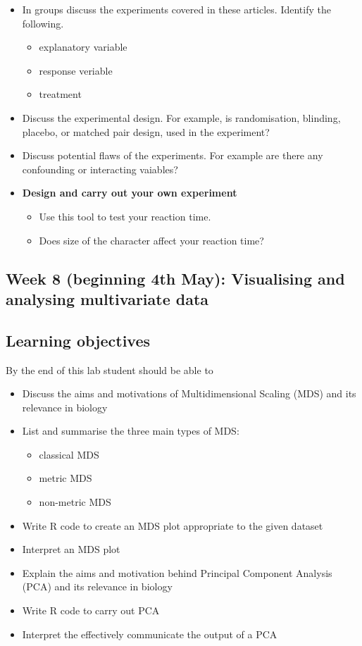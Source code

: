 \documentclass{article}
\begin{document}
\begin{itemize}
\item In groups discuss the experiments covered in these articles. Identify the following.
  \begin{itemize}
  \item explanatory variable
  \item response veriable
  \item treatment 
  \end{itemize}
\item Discuss the experimental design. For example, is randomisation, blinding, placebo, or matched pair design, used in the experiment?
\item Discuss potential flaws of the experiments. For example are there any confounding or interacting vaiables?
\item \textbf{Design and carry out your own experiment}
  \begin{itemize}
  \item Use this tool to test your reaction time.
  \item Does size of the character affect your reaction time?
  \end{itemize}
\end{itemize}

\subsection*{Week 8 (beginning 4th May): Visualising and analysing multivariate data}
\subsection*{Learning objectives}
By the end of this lab student should be able to
\begin{itemize}
\item Discuss the aims and motivations of Multidimensional Scaling (MDS) and its relevance in biology
\item List and summarise the three main types of MDS:
  \begin{itemize}
  \item classical MDS
  \item metric MDS
  \item non-metric MDS
  \end{itemize}
\item Write R code to create an MDS plot appropriate to the given dataset
\item Interpret an MDS plot
\item Explain the aims and motivation behind Principal Component Analysis (PCA) and its relevance in biology 
\item Write R code to carry out PCA
  \item Interpret the effectively communicate the output of a PCA 
\end{itemize}
\end{document}

